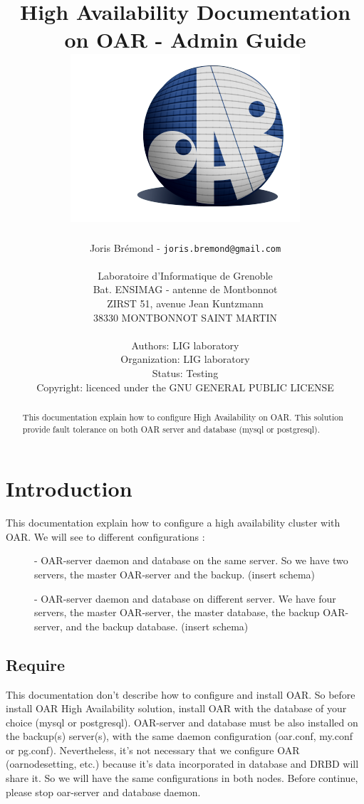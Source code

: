 \documentclass[a4paper,10pt]{report}
\title{High Availability Documentation on OAR - Admin Guide\\
\includegraphics[scale=0.7]{schema/oar_logo.png}}
\author{Joris Brémond - \texttt{joris.bremond@gmail.com}\\
\\
Laboratoire d'Informatique de Grenoble\\
Bat. ENSIMAG - antenne de Montbonnot\\
ZIRST 51, avenue Jean Kuntzmann\\
38330 MONTBONNOT SAINT MARTIN\\
\\
Authors: LIG laboratory\\
Organization: LIG laboratory\\
Status: Testing\\
Copyright: licenced under the GNU GENERAL PUBLIC LICENSE\\
}
\begin{document}
\maketitle
\tableofcontents

\begin{abstract}
This documentation explain how to configure High Availability on OAR. This solution provide fault tolerance on both OAR server and database (mysql or postgresql).
\end{abstract}












  
\chapter{Introduction}
This documentation explain how to configure a high availability cluster with OAR. We will see to different configurations :
\begin{description}
\item[]- OAR-server daemon and database on the same server. So we have two servers, the master OAR-server and the backup.
(insert schema)
\item[]- OAR-server daemon and database on different server. We have four servers, the master OAR-server, the master database, the backup OAR-server, and the backup database.
(insert schema)
\end{description}


\section{Require}
This documentation don't describe how to configure and install OAR. So before install OAR High Availability solution, install OAR with the database of your choice (mysql or postgresql). OAR-server and database must be also installed on the backup(s) server(s), with the same daemon configuration (oar.conf, my.conf or pg.conf). Nevertheless, it's not necessary that we configure OAR (oarnodesetting, etc.) because it's data incorporated in database and DRBD will share it. So we will have the same configurations in both nodes.
Before continue, please stop oar-server and database daemon.
\end{document}
